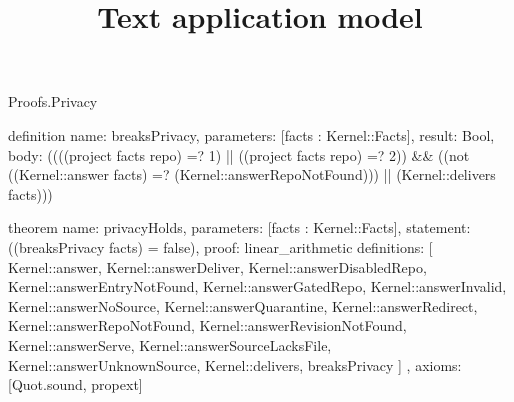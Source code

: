 \begin{lexlean}{Proofs.Privacy}
\title{Text application model}
\begin{semanticmodule}
definition{
  name: breaksPrivacy,
  parameters: [facts : Kernel::Facts],
  result: Bool,
  body: ((((project facts repo) =? 1) || ((project facts repo) =? 2)) && ((not ((Kernel::answer facts) =? (Kernel::answerRepoNotFound))) || (Kernel::delivers facts)))
}

theorem{
  name: privacyHolds,
  parameters: [facts : Kernel::Facts],
  statement: ((breaksPrivacy facts) = false),
  proof: linear_arithmetic{
    definitions: [
      Kernel::answer,
      Kernel::answerDeliver,
      Kernel::answerDisabledRepo,
      Kernel::answerEntryNotFound,
      Kernel::answerGatedRepo,
      Kernel::answerInvalid,
      Kernel::answerNoSource,
      Kernel::answerQuarantine,
      Kernel::answerRedirect,
      Kernel::answerRepoNotFound,
      Kernel::answerRevisionNotFound,
      Kernel::answerServe,
      Kernel::answerSourceLacksFile,
      Kernel::answerUnknownSource,
      Kernel::delivers,
      breaksPrivacy
    ]
  },
  axioms: [Quot.sound, propext]
}
\end{semanticmodule}
\end{lexlean}
